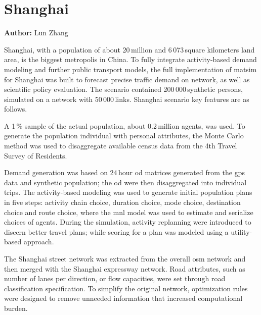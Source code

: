 \section{Shanghai}
\label{sec:shanghai}
\hfill \textbf{Author:} Lun Zhang


Shanghai, with a population of about 20\,million and 6\,073\,square kilometers land area, is the biggest metropolis in China. To fully integrate activity-based demand modeling and further public transport models, the full implementation of \gls{matsim} for Shanghai was built to forecast precise traffic demand on network, as well as scientific policy evaluation. The scenario contained 200\,000\,synthetic persons, simulated on a network with 50\,000\,links. Shanghai scenario key features are as follows.

A 1\,\% sample of the actual population, about 0.2\,million agents, was used. To generate the population individual with personal attributes, the Monte Carlo method was used to disaggregate available census data from the 4th Travel Survey of Residents.

Demand generation was based on 24\,hour \gls{od} matrices generated from the \gls{gps} data and synthetic population; the \gls{od} were then disaggregated into individual trips. The activity-based modeling was used to generate initial population plans in five steps: activity chain choice, duration choice, mode choice, destination choice and route choice, where the \gls{mnl} model was used to estimate and serialize choices of agents. During the simulation, activity \gls{replanning} were introduced to discern better travel plans; while scoring for a plan was modeled using a utility-based approach.

The Shanghai street network was extracted from the overall \gls{osm} network and then merged with the Shanghai expressway network. Road attributes, such as  number of lanes per direction, or  flow capacities, were set through road classification specification. To simplify the original network, optimization rules were designed to remove unneeded information that increased computational burden.


